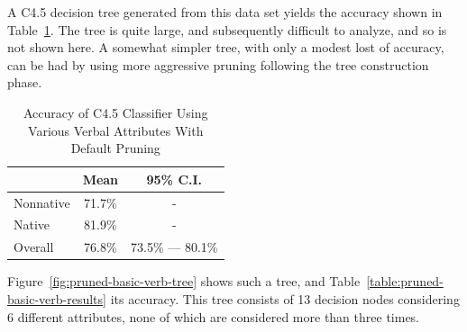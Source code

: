 \documentclass[main.tex]{subfiles}
\begin{document}
A C4.5 decision tree generated from this data set yields the accuracy shown in Table~\ref{table:normally-pruned-basic-verb-results}. The tree is quite large, and subsequently difficult to analyze, and so is not shown here. A somewhat simpler tree, with only a modest lost of accuracy, can be had by using more aggressive pruning following the tree construction phase. \begin{table}[htbp]
\centering
\caption{Accuracy of C4.5 Classifier Using Various Verbal Attributes With Default Pruning}
\begin{tabular}{l c c}
\toprule
& Mean & 95\% C.I.\\
\midrule
Nonnative & 71.7\% & - \\
[6pt]Native & 81.9\% & - \\
[6pt]Overall & 76.8\% & 73.5\% --- 80.1\% \\
\bottomrule
\end{tabular}
\label{table:normally-pruned-basic-verb-results}
\end{table} Figure~\ref{fig:pruned-basic-verb-tree} shows such a tree, and Table~\ref{table:pruned-basic-verb-results} its accuracy. This tree consists of 13 decision nodes considering 6 different attributes, none of which are considered more than three times.

\end{document}
